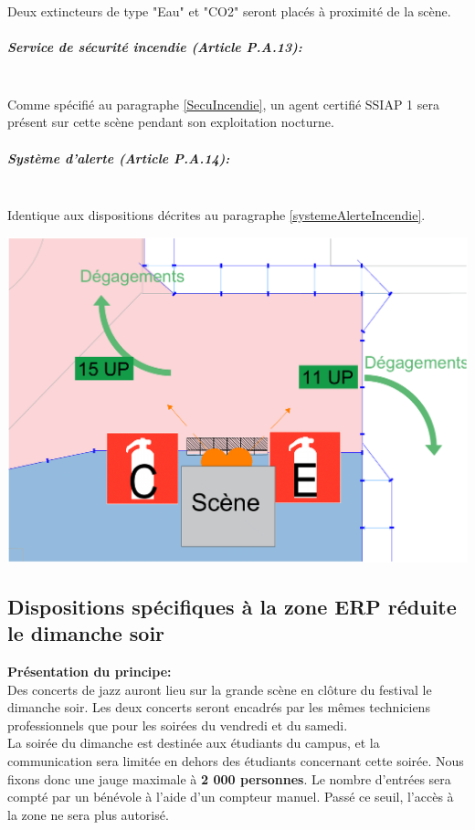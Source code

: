 \documentclass[hidelinks, paper=a4, fontsize=13pt]{report}
\begin{document}
Deux extincteurs de type "Eau" et "CO2" seront placés à proximité de la scène.

\subparagraph*{Service de sécurité incendie (Article P.A.13):}\mbox{}\\

Comme spécifié au paragraphe \ref{SecuIncendie}, un agent certifié SSIAP 1 sera présent sur cette scène pendant son exploitation nocturne. \\

\subparagraph*{Système d'alerte (Article P.A.14):}\mbox{}\\

Identique aux dispositions décrites au paragraphe \ref{systemeAlerteIncendie}.

\begin{center}
	\includegraphics[width=.8\textwidth,keepaspectratio]{Exports/Plan_24h_44eme-3e_Scene_Secu_Incendie}
\end{center}

\newpage 

\subsection{Dispositions spécifiques à la zone ERP réduite le dimanche soir}

\textbf{Présentation du principe:}\\
Des concerts de jazz auront lieu sur la grande scène en clôture du festival le dimanche soir. Les deux concerts seront encadrés par les mêmes techniciens professionnels que pour les soirées du vendredi et du samedi.\\

La soirée du dimanche est destinée aux étudiants du campus, et la communication sera limitée en dehors des étudiants concernant cette soirée. Nous fixons donc une jauge maximale à \textbf{2 000 personnes}. Le nombre d'entrées sera compté par un bénévole à l'aide d'un compteur manuel. Passé ce seuil, l'accès à la zone ne sera plus autorisé.\\
\end{document}
